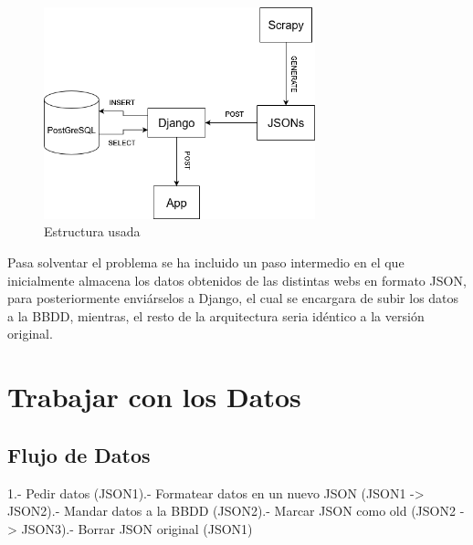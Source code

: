 \begin{figure} [H]
	\centering
	\includegraphics[width=0.7\textwidth]{fig/estructura_usada.png}
	\caption[Estructura de datos usada en el proyecto]{Estructura usada}
	\label{fig:ej10}
\end{figure}

Pasa solventar el problema se ha incluido un paso intermedio en el que inicialmente almacena los datos obtenidos de las distintas webs en formato JSON, para posteriormente enviárselos a Django, el cual se encargara de subir los datos a la BBDD, mientras, el resto de la arquitectura seria idéntico a la versión original.

\section{Trabajar con los Datos}

\subsection{Flujo de Datos}
1.- Pedir datos (JSON1).- Formatear datos en un nuevo JSON (JSON1 -> JSON2).- Mandar datos a la BBDD (JSON2).- Marcar JSON como old (JSON2 -> JSON3).- Borrar JSON original (JSON1)\newline

